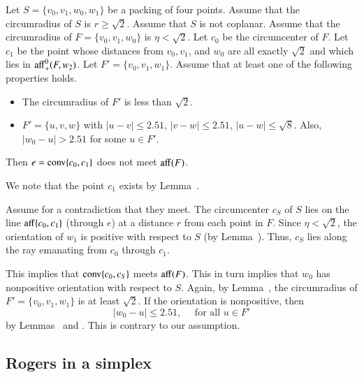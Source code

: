 \begin{tarskidata}
\begin{tarski}
\begin{lemma}
Let $S=\{v_0,v_1,w_0,w_1\}$ be a packing of four points.
Assume that the circumradius of $S$ is $r\ge \sqrt2$.  Assume
that $S$ is not coplanar.   Assume
that the circumradius of $F=\{v_0,v_1,w_0\}$ is
  $\eta < \sqrt2$.   Let $c_0$ be the circumcenter of $F$.
Let $c_1$ be the point whose distances from $v_0,v_1$, and $w_0$ are
all exactly $\sqrt2$ and which lies in
${\operatorname{aff}}^0_+(F,w_2)$.
Let $F'=\{v_0,v_1,w_1\}$.  Assume that at least one of
the following
properties holds.
\begin{itemize}
  \item The circumradius of $F'$ is less than $\sqrt2$.
  \item $F'=\{u,v,w\}$ with $|u-v| \le 2.51$, $|v-w|\le 2.51$,
        $|u-w|\le\sqrt8$. Also, $|w_0-u|>2.51$ for some $u\in F'$.
\end{itemize}

Then $e={\operatorname{conv}}\{c_0,c_1\}$ does not
meet ${\operatorname{aff}}(F)$.
\end{lemma}

\begin{proved}   We note that the point $c_1$ exists 
by Lemma~.

Assume for a contradiction that they meet.
The circumcenter $c_S$ of $S$ lies on
the line ${\operatorname{aff}}\{c_0,c_1\}$ (through $e$) at a
distance $r$ from each point in $F$.  
Since $\eta < \sqrt2$, the orientation of $w_1$ is positive
with respect to $S$ (by Lemma~). 
Thus, $c_S$ lies along
the ray emanating from $c_0$ through $c_1$.  

This implies that ${\operatorname{conv}}\{c_0,c_S\}$ meets ${\operatorname{aff}}(F)$.
This in turn implies that $w_0$ has nonpositive orientation with
respect to $S$.  Again, by Lemma~, the
circumradius of $F'=\{v_0,v_1,w_1\}$ is at least $\sqrt2$.
If the orientation is
nonpositive, then 
   $$|w_0-u|\le 2.51,\quad\text{ for all } u\in F'$$
by Lemmas~ and
. This is contrary to our assumption.
\swallowed\end{proved}
\end{tarski}






\begin{tarski}
\section{Rogers in a simplex}


\end{tarski}
\end{tarskidata}
